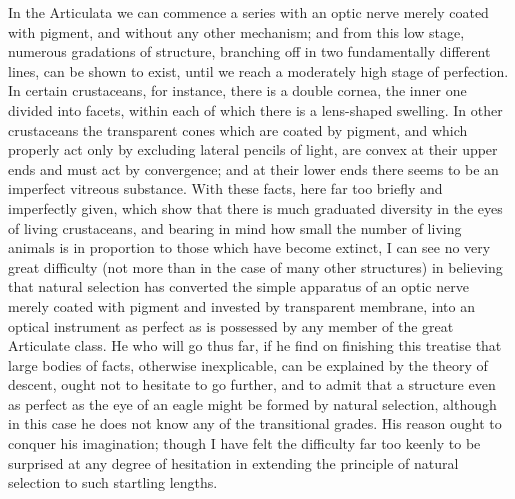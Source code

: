 In the Articulata we can commence a series with an optic nerve merely coated with pigment, and without any other mechanism; and from this low stage, numerous gradations of structure, branching off in two fundamentally different lines, can be shown to exist, until we reach a moderately high stage of perfection. In certain crustaceans, for instance, there is a double cornea, the inner one divided into facets, within each of which there is a lens-shaped swelling. In other crustaceans the transparent cones which are coated by pigment, and which properly act only by excluding lateral pencils of light, are convex at their upper ends and must act by convergence; and at their lower ends there seems to be an imperfect vitreous substance. With these facts, here far too briefly and imperfectly given, which show that there is much graduated diversity in the eyes of living crustaceans, and bearing in mind how small the number of living animals is in proportion to those which have become extinct, I can see no very great difficulty (not more than in the case of many other structures) in believing that natural selection has converted the simple apparatus of an optic nerve merely coated with pigment and invested by transparent membrane, into an optical instrument as perfect as is possessed by any member of the great Articulate class.
He who will go thus far, if he find on finishing this treatise that large bodies of facts, otherwise inexplicable, can be explained by the theory of descent, ought not to hesitate to go further, and to admit that a structure even as perfect as the eye of an eagle might be formed by natural selection, although in this case he does not know any of the transitional grades. His reason ought to conquer his imagination; though I have felt the difficulty far too keenly to be surprised at any degree of hesitation in extending the principle of natural selection to such startling lengths.
